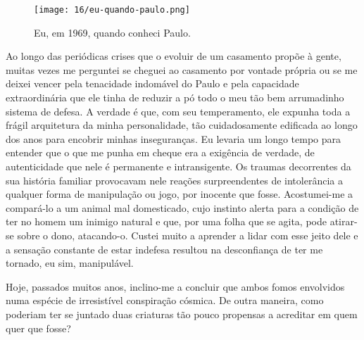 \begin{figure}
\centering
\texttt{[image: 16/eu-quando-paulo.png]}
\caption{Eu, em 1969, quando conheci Paulo.}
\end{figure}

Ao longo das periódicas crises que o evoluir de um casamento propõe à gente, muitas vezes me perguntei se cheguei ao casamento por vontade própria ou se me deixei vencer pela tenacidade indomável do Paulo e pela capacidade extraordinária que ele tinha de reduzir a pó todo o meu tão bem arrumadinho sistema de defesa.
A verdade é que, com seu temperamento, ele expunha toda a frágil arquitetura da minha personalidade, tão cuidadosamente edificada ao longo dos anos para encobrir minhas inseguranças.
Eu levaria um longo tempo para entender que o que me punha em cheque era a exigência de verdade, de autenticidade que nele é permanente e intransigente.
Os traumas decorrentes da sua história familiar provocavam nele reações surpreendentes de intolerância a qualquer forma de manipulação ou jogo, por inocente que fosse.
Acostumei-me a compará-lo a um animal mal domesticado, cujo instinto alerta para a condição de ter no homem um inimigo natural e que, por uma folha que se agita, pode atirar-se sobre o dono, atacando-o.
Custei muito a aprender a lidar com esse jeito dele e a sensação constante de estar indefesa resultou na desconfiança de ter me tornado, eu sim, manipulável.

Hoje, passados muitos anos, inclino-me a concluir que ambos fomos envolvidos numa espécie de irresistível conspiração cósmica.
De outra maneira, como poderiam ter se juntado duas criaturas tão pouco propensas a acreditar em quem quer que fosse?
